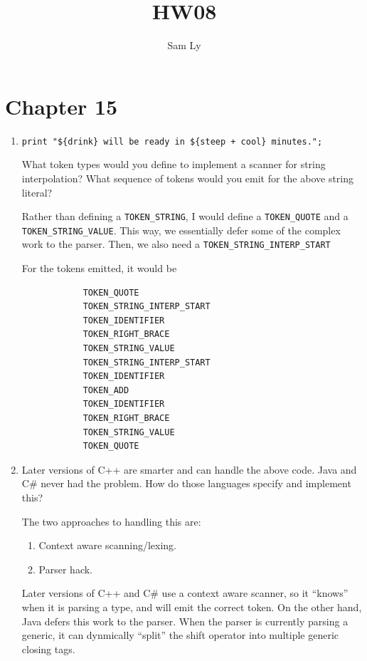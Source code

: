 \documentclass{article}
\title{HW08}
\author{Sam Ly}
\begin{document}
\maketitle

\section*{Chapter 15}
\begin{enumerate}
    \item {
        \verb|print "${drink} will be ready in ${steep + cool} minutes.";|

        What token types would you define to implement a scanner for string interpolation? What sequence of tokens would you emit for the above string literal?

        Rather than defining a \verb|TOKEN_STRING|, I would define a \verb|TOKEN_QUOTE|
        and a \verb|TOKEN_STRING_VALUE|. This way, we essentially defer some of the 
        complex work to the parser. Then, we also need a \verb|TOKEN_STRING_INTERP_START|

        For the tokens emitted, it would be 
        \begin{verbatim}
            TOKEN_QUOTE 
            TOKEN_STRING_INTERP_START 
            TOKEN_IDENTIFIER 
            TOKEN_RIGHT_BRACE
            TOKEN_STRING_VALUE
            TOKEN_STRING_INTERP_START 
            TOKEN_IDENTIFIER
            TOKEN_ADD
            TOKEN_IDENTIFIER
            TOKEN_RIGHT_BRACE 
            TOKEN_STRING_VALUE 
            TOKEN_QUOTE
        \end{verbatim}
    }

    \item {
        Later versions of C++ are smarter and can handle the above code. Java and C\# never had the problem. How do those languages specify and implement this?

        The two approaches to handling this are:
        \begin{enumerate}
            \item Context aware scanning/lexing.
            \item Parser hack.
        \end{enumerate}

        Later versions of C++ and C\# use a context aware scanner, so it ``knows''
        when it is parsing a type, and will emit the correct token. On the 
        other hand, Java defers this work to the parser. When the parser is 
        currently parsing a generic, it can dynmically ``split'' the shift operator 
        into multiple generic closing tags. 
    }


\end{enumerate}
\end{document}
